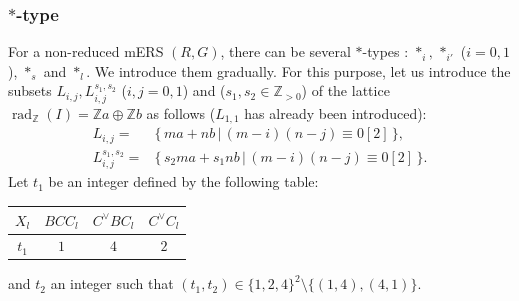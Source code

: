 \documentclass[11pt]{amsart}
\newcommand{\Z}{\mathbb{Z}}
\newcommand{\rad}{\operatorname{rad}}
\begin{document}
\subsubsection{$\ast$-type}\label{sect:intro_non-red-star}
For a non-reduced mERS $(R,G)$, there can be several $\ast$-types : $\ast_i, \, \ast_{i'}$ ($i=0,1$), $\ast_s$ and $\ast_l$. We introduce them gradually. For this purpose, let us  introduce the subsets $L_{i,j}, L_{i,j}^{s_1,s_2}$ ($i,j=0,1$) and ($s_1, s_2 \in \Z_{>0}$) of the lattice $\rad_{\Z}(I)=\Z a\oplus \Z b$ as follows ($L_{1,1}$ has already been introduced):
\begin{align*}
L_{i,j}=
&\{\, ma+nb\, \vert \, (m-i)(n-j)\equiv 0 [2]\, \}, \\
L_{i,j}^{s_1,s_2}=
&\{\, s_2ma+s_1nb\, \vert \, (m-i)(n-j)\equiv 0 [2]\, \}. 
\end{align*}
Let $t_1$ be an integer defined by the following table: \\
\begin{center}
\begin{tabular}{|c||c|c|c|} \hline
$X_l$ & $BCC_l$ & $C^\vee BC_l $ & $C^\vee C_l$  \\ \hline
$t_1$ & $1$ & $4$ & $2$  \\ \hline
\end{tabular}
\end{center}
\vskip 0.1in

and $t_2$  an integer such that $(t_1, t_2) \in \{1,2,4\}^2 \setminus \{ (1,4), (4,1)\}$.  \\
\end{document}
